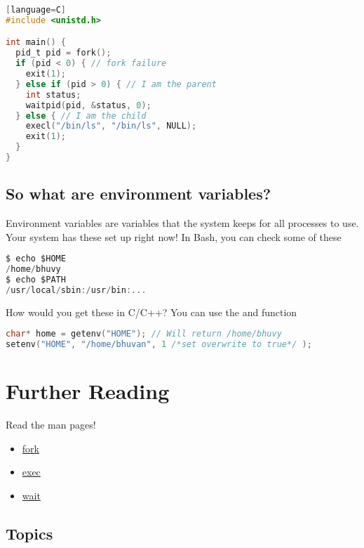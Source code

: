 \begin{lstlisting}[language=C][language=C]
#include <unistd.h>

int main() {
  pid_t pid = fork();
  if (pid < 0) { // fork failure
    exit(1);
  } else if (pid > 0) { // I am the parent
    int status;
    waitpid(pid, &status, 0);
  } else { // I am the child
    execl("/bin/ls", "/bin/ls", NULL);
    exit(1);
  }
}
\end{lstlisting}

\subsection{So what are environment variables?}\label{so-what-are-environment-variables}

Environment variables are variables that the system keeps for all processes to use. Your system has these set up right now! In Bash, you can check some of these

\begin{lstlisting}[language=C]
$ echo $HOME
/home/bhuvy
$ echo $PATH
/usr/local/sbin:/usr/bin:...
\end{lstlisting}

How would you get these in C/C++? You can use the  and  function

\begin{lstlisting}[language=C]
char* home = getenv("HOME"); // Will return /home/bhuvy
setenv("HOME", "/home/bhuvan", 1 /*set overwrite to true*/ );
\end{lstlisting}

\section{Further Reading}\label{how-can-i-find-out-more}

Read the man pages! 
\begin{itemize}
\item \href{http://man7.org/linux/man-pages/man2/fork.2.html}{fork} 
\item \href{http://man7.org/linux/man-pages/man3/exec.3.html}{exec} 
\item \href{http://man7.org/linux/man-pages/man2/wait.2.html}{wait}
\end{itemize}

\subsection{Topics}\label{topics}

